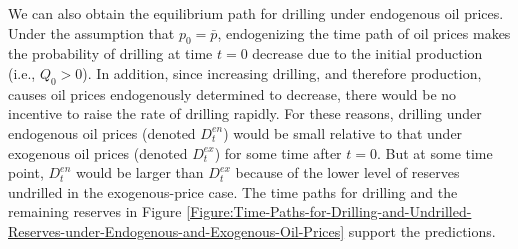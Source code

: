 We can also obtain the equilibrium path for drilling under endogenous oil prices. Under the assumption that $p_{0} = \bar{p}$, endogenizing the time path of oil prices makes the probability of drilling at time $t = 0$ decrease due to the initial production (i.e., $Q_{0} > 0$). In addition, since increasing drilling, and therefore production, causes oil prices endogenously determined to decrease, there would be no incentive to raise the rate of drilling rapidly. For these reasons, drilling under endogenous oil prices (denoted $D_{t}^{en}$) would be small relative to that under exogenous oil prices (denoted $D_{t}^{ex}$) for some time after $t = 0$. But at some time point, $D_{t}^{en}$ would be larger than $D_{t}^{ex}$ because of the lower level of reserves undrilled in the exogenous-price case. The time paths for drilling and the remaining reserves in Figure \ref{Figure:Time-Paths-for-Drilling-and-Undrilled-Reserves-under-Endogenous-and-Exogenous-Oil-Prices} support the predictions. 

